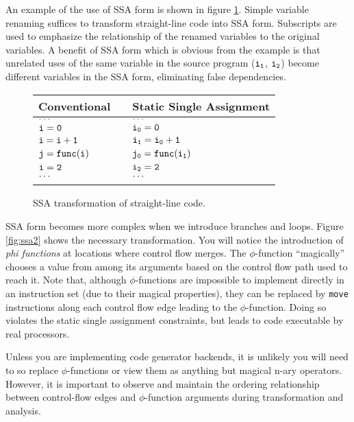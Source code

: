 \documentclass[11pt,notitlepage,twocolumn,twoside]{article}
\newcommand{\phifunction}{$\phi$-function}
\begin{document}
An example of the use of SSA form is shown in figure \ref{fig:ssa1}.
Simple variable renaming suffices to transform straight-line code into
SSA form.  Subscripts are used to emphasize the relationship of the
renamed variables to the original variables.  A benefit of SSA form
which is obvious from the example is that unrelated uses of the same variable
in the source program ($\tt i_1$, $\tt i_2$) become different
variables in the SSA form, eliminating false dependencies.

\begin{figure}[t]
\begin{tabular}{lll}
Conventional    && Static Single Assignment \\ \hline
$\tt \ldots$    && $\tt \ldots$ \\
$\tt i=0$       && $\tt i_0 = 0$ \\
$\tt i=i+1$     && $\tt i_1 = i_0 + 1$ \\
$\tt j=func(i)$ && $\tt j_0 = func(i_1)$ \\
$\tt i=2$       && $\tt i_2 = 2$ \\
$\tt \ldots$    && $\tt \ldots$ \\
\\
\end{tabular}
\caption{SSA transformation of straight-line code.}
\label{fig:ssa1}
\end{figure}

SSA form becomes more complex when we
introduce branches and loops.  Figure \ref{fig:ssa2} shows the
necessary transformation.  You will notice the introduction of
\textit{phi functions} at locations where control flow merges.  The
\phifunction{} ``magically'' chooses a value from among its arguments
based on the control flow path used to reach it.  Note that, although
\phifunction{s} are impossible to implement directly in an instruction set
(due to their magical properties), they can be replaced by \texttt{move}
instructions along each control flow edge leading to the
\phifunction{}.  Doing so violates the static single assignment
constraints, but leads to code executable by real processors.

Unless you are implementing code generator backends, it is unlikely
you will need to so replace \phifunction{s} or view them as anything
but magical n-ary operators.  However, it is important to observe and 
maintain the ordering relationship between control-flow edges and 
\phifunction{} arguments during transformation and analysis.
\end{document}
